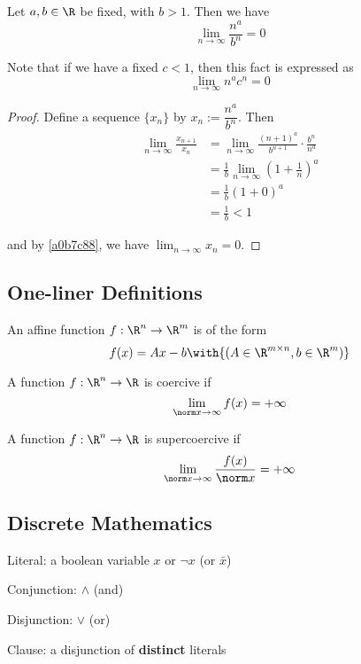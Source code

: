 \label{cf2b74d}

Let $a,b\in\R$ be fixed, with $b>1$. Then we have
$$
  \lim_{n\to\infty}\frac{n^a}{b^n}=0
$$

Note that if we have a fixed $c<1$, then this fact is expressed as
$$
  \lim_{n\to\infty}n^a{c^n}=0
$$

\begin{proof}
  Define a sequence $\{x_n\}$ by $x_n:=\dfrac{n^a}{b^n}$. Then
  \begin{align*}
    \lim_{n\to\infty}\frac{x_{n+1}}{x_n}
     &=\lim_{n\to\infty}\frac{(n+1)^a}{b^{n+1}}\cdot\frac{b^n}{n^a} \\
     &=\frac1b\lim_{n\to\infty}\left(1+\frac1n\right)^a             \\
     &=\frac1b(1+0)^a                                               \\
     &=\frac1b<1
  \end{align*}

  and by \autoref{a0b7c88}, we have $\displaystyle\lim_{n\to\infty}x_n=0$.
\end{proof}

\subsection{One-liner Definitions}\label{a5ec1bb}

\label{dcb7f73}

An affine function $f:\R^n\to\R^m$ is of the form
$$
  f(x)=Ax-b\with{(A\in\R^{m\times n},b\in\R^m)}
$$

\label{e9c7871}

A function $f:\R^n\to\R$ is coercive if
$$
  \lim_{\norm x\to\infty}f(x)=+\infty
$$

\label{a0444cc}

A function $f:\R^n\to\R$ is supercoercive if
$$
  \lim_{\norm x\to\infty}\frac{f(x)}{\norm x}=+\infty
$$

\subsection{Discrete Mathematics}\label{ec9b661}

\label{ba4e2fa}

\begin{enumerata}
  \item Literal: a boolean variable $x$ or $\neg x$ (or $\bar x$)
  \item Conjunction: $\land$ (and)
  \item Disjunction: $\lor$ (or)
  \item Clause: a disjunction of \textbf{distinct} literals
\end{enumerata}

